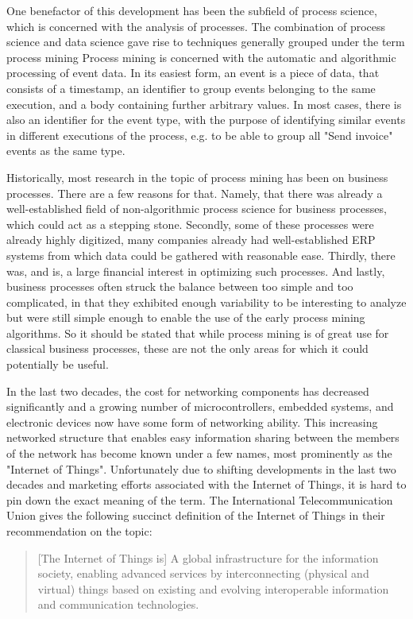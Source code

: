 \documentclass[runningheads]{template/llncs}
\begin{document}
One benefactor of this development has been the subfield of process science, which is concerned with the analysis of processes.
The combination of process science and data science gave rise to techniques generally grouped under the term process mining
Process mining  \cite{Aals16} is concerned with the automatic and algorithmic processing of event data. In its easiest form, an event is a piece of data, that consists of a timestamp, an identifier to group events belonging to the same execution, and a body containing further arbitrary values.
In most cases, there is also an identifier for the event type, with the purpose of identifying similar events in different executions of the process, e.g. to be able to group all "Send invoice" events as the same type.

Historically, most research in the topic of process mining has been on business processes. 
There are a few reasons for that. 
Namely, that there was already a well-established field of non-algorithmic process science for business processes, which could act as a stepping stone.
Secondly, some of these processes were already highly digitized, many companies already had well-established ERP systems from which data could be gathered with reasonable ease.
Thirdly, there was, and is, a large financial interest in optimizing such processes.
And lastly, business processes often struck the balance between too simple and too complicated, in that they exhibited enough variability to be interesting to analyze but were still simple enough to enable the use of the early process mining algorithms.
So it should be stated that while process mining is of great use for classical business processes, these are not the only areas for which it could potentially be useful.

In the last two decades, the cost for networking components has decreased significantly and a growing number of microcontrollers, embedded systems, and electronic devices now have some form of networking ability.
This increasing networked structure that enables easy information sharing between the members of the network has become known under a few names, most prominently as the "Internet of Things".
Unfortunately due to shifting developments in the last two decades and marketing efforts associated with the Internet of Things, it is hard to pin down the exact meaning of the term. 
The International Telecommunication Union gives the following succinct definition of the Internet of Things in their recommendation \cite{ITUT12} on the topic:
\blockquote{[The Internet of Things is] A  global  infrastructure  for  the  information  society,  enabling  advanced  services  by  interconnecting  (physical  and  virtual)  things  based  on  existing  and  evolving  interoperable information and communication technologies.}
\end{document}
